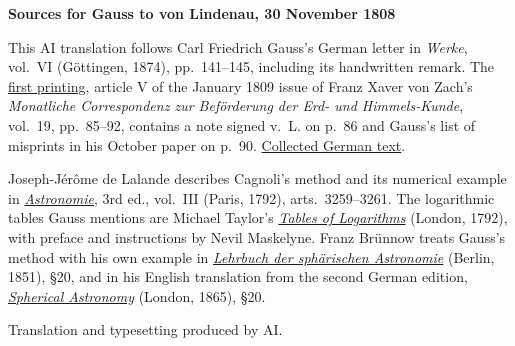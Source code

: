 \clearpage\thispagestyle{empty}
\begin{center}\textbf{Sources for Gauss to von Lindenau, 30 November 1808}\end{center}
\noindent This AI translation follows Carl Friedrich Gauss’s German letter in \textit{Werke}, vol.~VI (Göttingen, 1874), pp.~141--145, including its handwritten remark. The \href{https://archive.org/details/bub_gb_caMAAAAAMAAJ/page/n91/mode/1up}{first printing}, article V of the January 1809 issue of Franz Xaver von Zach’s \textit{Monatliche Correspondenz zur Beförderung der Erd- und Himmels-Kunde}, vol.~19, pp.~85--92, contains a note signed v.~L. on p.~86 and Gauss’s list of misprints in his October paper on p.~90. \href{https://gdz.sub.uni-goettingen.de/id/PPN236007467}{Collected German text}.
\par\smallskip\noindent Joseph-Jérôme de Lalande describes Cagnoli’s method and its numerical example in \href{https://doi.org/10.3931/e-rara-9241}{\textit{Astronomie}}, 3rd ed., vol.~III (Paris, 1792), arts.~3259--3261. The logarithmic tables Gauss mentions are Michael Taylor’s \href{https://doi.org/10.3931/e-rara-9132}{\textit{Tables of Logarithms}} (London, 1792), with preface and instructions by Nevil Maskelyne. Franz Brünnow treats Gauss’s method with his own example in \href{https://archive.org/details/bub_gb_sAA5AAAAMAAJ/page/n306/mode/1up}{\textit{Lehrbuch der sphärischen Astronomie}} (Berlin, 1851), §20, and in his English translation from the second German edition, \href{https://archive.org/details/sphericalastro00brhurich/page/n328/mode/1up}{\textit{Spherical Astronomy}} (London, 1865), §20.
\par\smallskip\noindent Translation and typesetting produced by AI.
\clearpage
